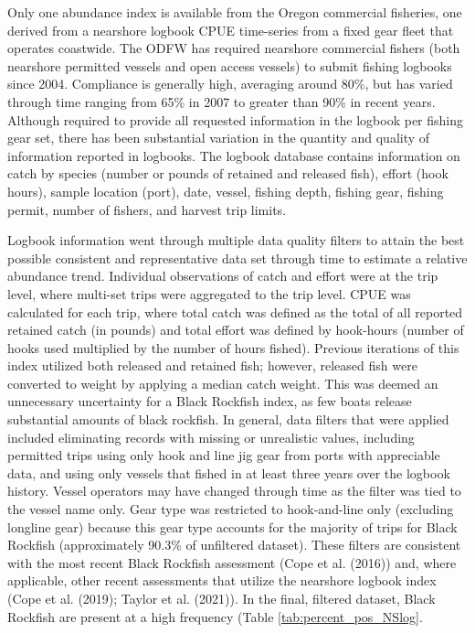 \documentclass[11pt,
  english,
  letterpaper,
]{article}
\begin{document}
Only one abundance index is available from the Oregon commercial fisheries, one derived from a nearshore logbook CPUE time-series from a fixed gear fleet that operates coastwide. The ODFW has required nearshore commercial fishers (both nearshore permitted vessels and open access vessels) to submit fishing logbooks since 2004. Compliance is generally high, averaging around 80\%, but has varied through time ranging from 65\% in 2007 to greater than 90\% in recent years. Although required to provide all requested information in the logbook per fishing gear set, there has been substantial variation in the quantity and quality of information reported in logbooks. The logbook database contains information on catch by species (number or pounds of retained and released fish), effort (hook hours), sample location (port), date, vessel, fishing depth, fishing gear, fishing permit, number of fishers, and harvest trip limits.

Logbook information went through multiple data quality filters to attain the best possible consistent and representative data set through time to estimate a relative abundance trend. Individual observations of catch and effort were at the trip level, where multi-set trips were aggregated to the trip level. CPUE was calculated for each trip, where total catch was defined as the total of all reported retained catch (in pounds) and total effort was defined by hook-hours (number of hooks used multiplied by the number of hours fished). Previous iterations of this index utilized both released and retained fish; however, released fish were converted to weight by applying a median catch weight. This was deemed an unnecessary uncertainty for a Black Rockfish index, as few boats release substantial amounts of black rockfish. In general, data filters that were applied included eliminating records with missing or unrealistic values, including permitted trips using only hook and line jig gear from ports with appreciable data, and using only vessels that fished in at least three years over the logbook history. Vessel operators may have changed through time as the filter was tied to the vessel name only. Gear type was restricted to hook-and-line only (excluding longline gear) because this gear type accounts for the majority of trips for Black Rockfish (approximately 90.3\% of unfiltered dataset). These filters are consistent with the most recent Black Rockfish assessment (Cope et al. (2016)) and, where applicable, other recent assessments that utilize the nearshore logbook index (Cope et al. (2019); Taylor et al. (2021)). In the final, filtered dataset, Black Rockfish are present at a high frequency (Table \ref{tab:percent_pos_NSlog}.
\end{document}
